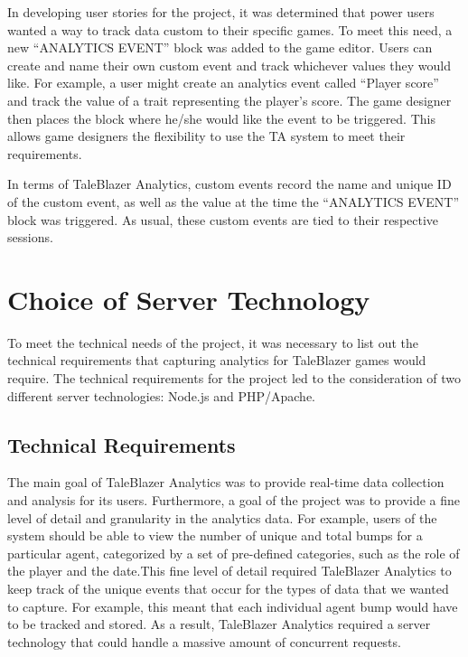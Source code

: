 In developing user stories for the project, it was determined that power users wanted a way to track data custom to their specific games. To meet this need, a new \newline ``ANALYTICS EVENT'' block was added to the game editor. Users can create and name their own custom event and track whichever values they would like. For example, a user might create an analytics event called ``Player score'' and track the value of a trait representing the player's score. The game designer then places the block where he/she would like the event to be triggered. This allows game designers the flexibility to use the TA system to meet their requirements.

In terms of TaleBlazer Analytics, custom events record the name and unique ID of the custom event, as well as the value at the time the ``ANALYTICS EVENT'' block was triggered. As usual, these custom events are tied to their respective sessions. 

\section{Choice of Server Technology}

To meet the technical needs of the project, it was necessary to list out the technical requirements that capturing analytics for TaleBlazer games would require. The technical requirements for the project led to the consideration of two different server technologies: Node.js and PHP/Apache. 

\subsection{Technical Requirements}

The main goal of TaleBlazer Analytics was to provide real-time data collection and analysis for its users. Furthermore, a goal of the project was to provide a fine level of detail and granularity in the analytics data. For example, users of the system should be able to view the number of unique and total bumps for a particular agent, categorized by a set of pre-defined categories, such as the role of the player and the date.This fine level of detail required TaleBlazer Analytics to keep track of the unique events that occur for the types of data that we wanted to capture. For example, this meant that each individual agent bump would have to be tracked and stored. As a result, TaleBlazer Analytics required a server technology that could handle a massive amount of concurrent requests. 

